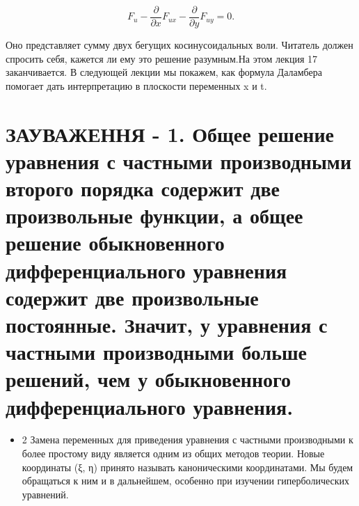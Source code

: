 \documentclass[
  ukrainian,
]{article}
\providecommand{\tightlist}{%
  \setlength{\itemsep}{0pt}\setlength{\parskip}{0pt}}
\begin{document}
\[
F_{u} - \frac{\partial}{\partial x} F_{ux} - \frac{\partial}{\partial y} F_{uy} = 0.
\]

Оно представляет сумму двух бегущих косинусоидальных воли. Читатель
должен спросить себя, кажется ли ему это решение разумным.На этом лекция
17 заканчивается. В следующей лекции мы покажем, как формула Даламбера
помогает дать интерпретацию в плоскости переменных x и t.

\section{ЗАУВАЖЕННЯ - 1. Общее решение уравнения с частными производными
второго порядка содержит две произвольные функции, а общее решение
обыкновенного дифференциального уравнения содержит две произвольные
постоянные. Значит, у уравнения с частными производными больше решений,
чем у обыкновенного дифференциального
уравнения.}\label{ux437ux430ux443ux432ux430ux436ux435ux43dux43dux44f---1.-ux43eux431ux449ux435ux435-ux440ux435ux448ux435ux43dux438ux435-ux443ux440ux430ux432ux43dux435ux43dux438ux44f-ux441-ux447ux430ux441ux442ux43dux44bux43cux438-ux43fux440ux43eux438ux437ux432ux43eux434ux43dux44bux43cux438-ux432ux442ux43eux440ux43eux433ux43e-ux43fux43eux440ux44fux434ux43aux430-ux441ux43eux434ux435ux440ux436ux438ux442-ux434ux432ux435-ux43fux440ux43eux438ux437ux432ux43eux43bux44cux43dux44bux435-ux444ux443ux43dux43aux446ux438ux438-ux430-ux43eux431ux449ux435ux435-ux440ux435ux448ux435ux43dux438ux435-ux43eux431ux44bux43aux43dux43eux432ux435ux43dux43dux43eux433ux43e-ux434ux438ux444ux444ux435ux440ux435ux43dux446ux438ux430ux43bux44cux43dux43eux433ux43e-ux443ux440ux430ux432ux43dux435ux43dux438ux44f-ux441ux43eux434ux435ux440ux436ux438ux442-ux434ux432ux435-ux43fux440ux43eux438ux437ux432ux43eux43bux44cux43dux44bux435-ux43fux43eux441ux442ux43eux44fux43dux43dux44bux435.-ux437ux43dux430ux447ux438ux442-ux443-ux443ux440ux430ux432ux43dux435ux43dux438ux44f-ux441-ux447ux430ux441ux442ux43dux44bux43cux438-ux43fux440ux43eux438ux437ux432ux43eux434ux43dux44bux43cux438-ux431ux43eux43bux44cux448ux435-ux440ux435ux448ux435ux43dux438ux439-ux447ux435ux43c-ux443-ux43eux431ux44bux43aux43dux43eux432ux435ux43dux43dux43eux433ux43e-ux434ux438ux444ux444ux435ux440ux435ux43dux446ux438ux430ux43bux44cux43dux43eux433ux43e-ux443ux440ux430ux432ux43dux435ux43dux438ux44f.}

\begin{itemize}
\tightlist
\item
  2 Замена переменных для приведения уравнения с частными производными к
  более простому виду является одним из общих методов теории. Новые
  координаты (ξ, η) принято называть каноническими координатами. Мы
  будем обращаться к ним и в дальнейшем, особенно при изучении
  гиперболических уравнений.
\end{itemize}
\end{document}
